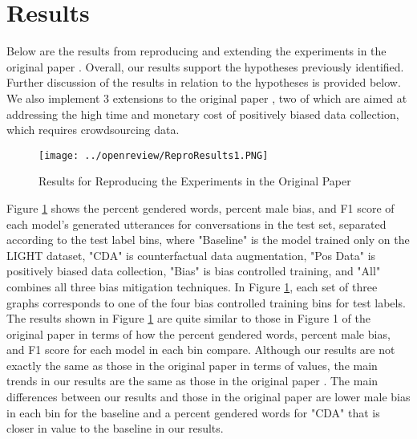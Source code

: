 \section{Results}
\label{sec:results}
Below are the results from reproducing and extending the experiments in the original paper \supercite{dinan2020}. Overall, our results support the hypotheses previously identified. Further discussion of the results in relation to the hypotheses is provided below. We also implement 3 extensions to the original paper \supercite{dinan2020}, two of which are aimed at addressing the high time and monetary cost of positively biased data collection, which requires crowdsourcing data.

\begin{figure}[t]
    \texttt{[image: ../openreview/ReproResults1.PNG]}
    \caption{Results for Reproducing the Experiments in the Original Paper \supercite{dinan2020}}
    \label{fig:reproResults}
\end{figure}

Figure \ref{fig:reproResults} shows the percent gendered words, percent male bias, and F1 score of each model’s generated utterances for conversations in the test set, separated according to the test label bins, where "Baseline" is the model trained only on the LIGHT dataset, "CDA" is counterfactual data augmentation, "Pos Data" is positively biased data collection, "Bias" is bias controlled training, and "All" combines all three bias mitigation techniques. In Figure \ref{fig:reproResults}, each set of three graphs corresponds to one of the four bias controlled training bins for test labels. The results shown in Figure \ref{fig:reproResults} are quite similar to those in Figure 1 of the original paper \supercite{dinan2020} in terms of how the percent gendered words, percent male bias, and F1 score for each model in each bin compare. Although our results are not exactly the same as those in the original paper \supercite{dinan2020} in terms of values, the main trends in our results are the same as those in the original paper \supercite{dinan2020}. The main differences between our results and those in the original paper \supercite{dinan2020} are lower male bias in each bin for the baseline and a percent gendered words for "CDA" that is closer in value to the baseline in our results.


